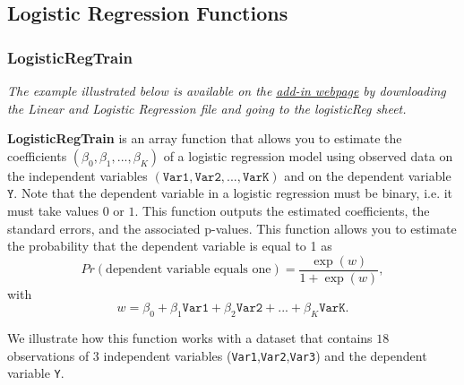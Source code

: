 \documentclass[12pt]{article}
\begin{document}



\subsection{Logistic Regression Functions}

\subsubsection{LogisticRegTrain}\label{logregtrain}

\textit{The example illustrated below is available on the}  \href{https://www8.gsb.columbia.edu/bizanalytics/excel-add-in/multiplatform#h-4}{ \textit{add-in webpage}}
 \textit{by downloading the Linear and Logistic Regression file and going to the logisticReg sheet.}

\textbf{LogisticRegTrain} is an array function that allows you to estimate the coefficients $(\beta_0,\beta_1,...,\beta_K)$ of a logistic regression model
using observed data on the independent variables $(\texttt{Var1},\texttt{Var2},...,\texttt{VarK})$ and on the dependent variable $\texttt{Y}$. Note that the dependent variable in a logistic regression must be binary, i.e. it must take values $0$ or $1$. This function outputs the estimated coefficients, the standard errors, and the associated p-values. This function allows you to estimate the probability that the dependent variable is equal to 1 as
\[
Pr(\text{dependent variable equals one})=\frac{\exp(w)}{1+\exp(w)},
\]
with
\[
w=\beta_0+\beta_1 \texttt{Var1}+\beta_2 \texttt{Var2} +...+ \beta_K \texttt{VarK}.
\]

We illustrate how this function works with a dataset that contains $18$ observations of $3$ independent variables (\texttt{Var1},\texttt{Var2},\texttt{Var3}) and the dependent variable \texttt{Y}.
\end{document}
